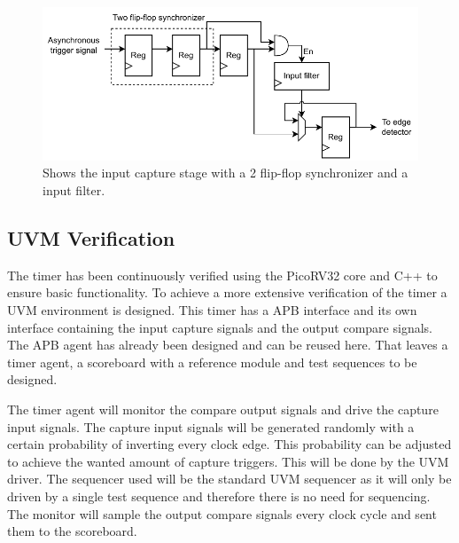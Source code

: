 \documentclass[./dissertation.tex]{subfiles}
\begin{document}
\begin{figure}[H]
    \centering
    \includegraphics[width = 1\linewidth]{subfiles/imgs/IP_Blocks_Pics/2ffsync.drawio.pdf}
    \caption{Shows the input capture stage with a 2 flip-flop synchronizer and a input filter.}
    \label{fig:2ff_sync_and_if}
\end{figure}

\subsection{UVM Verification}
The timer has been continuously verified using the PicoRV32 core and C++ to ensure basic functionality. To achieve a more extensive verification of the timer a UVM environment is designed. This timer has a APB interface and its own interface containing the input capture signals and the output compare signals. The APB agent has already been designed and can be reused here. That leaves a timer agent, a scoreboard with a reference module and test sequences to be designed. 

The timer agent will monitor the compare output signals and drive the capture input signals. The capture input signals will be generated randomly with a certain probability of inverting every clock edge. This probability can be adjusted to achieve the wanted amount of capture triggers. This will be done by the UVM driver. The sequencer used will be the standard UVM sequencer as it will only be driven by a single test sequence and therefore there is no need for sequencing. The monitor will sample the output compare signals every clock cycle and sent them to the scoreboard.
\end{document}
